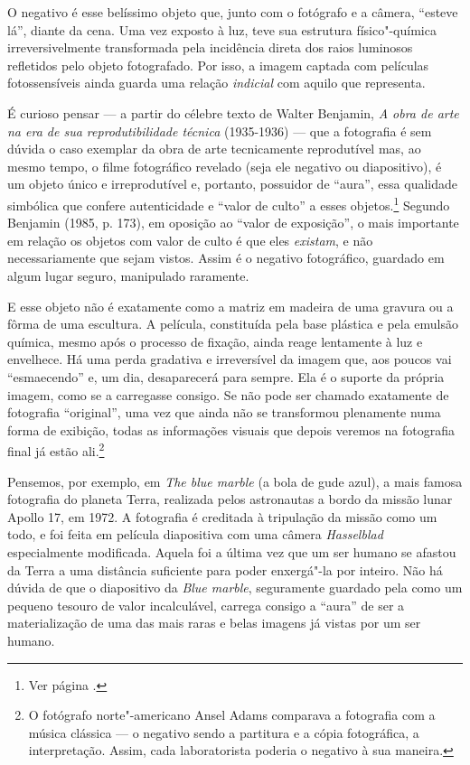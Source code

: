 O negativo é esse belíssimo objeto que, junto com o fotógrafo e a
câmera, ``esteve lá'', diante da cena. Uma vez exposto à luz, teve sua
estrutura físico"-química irreversivelmente transformada pela incidência
direta dos raios luminosos refletidos pelo objeto fotografado. Por isso,
a imagem captada com películas fotossensíveis ainda guarda uma relação
\emph{indicial} com aquilo que representa.

É curioso pensar --- a partir do célebre texto de Walter Benjamin,
\emph{A obra de arte na era de sua reprodutibilidade técnica} (1935-1936)
--- que a fotografia é sem dúvida o caso exemplar da obra de arte
tecnicamente reprodutível mas, ao mesmo tempo, o filme fotográfico
revelado (seja ele negativo ou diapositivo), é um objeto único e
irreprodutível e, portanto, possuidor de ``aura'', essa qualidade
simbólica que confere autenticidade e ``valor de culto'' a esses
objetos.\footnote{Ver página \pageref{benjamin}.} Segundo Benjamin
(1985, p. 173), em oposição ao ``valor de exposição'', o mais importante
em relação os objetos com valor de culto é que eles \emph{existam}, e
não necessariamente que sejam vistos. Assim é o negativo fotográfico,
guardado em algum lugar seguro, manipulado raramente.

E esse objeto não é exatamente como a matriz em madeira de uma gravura
ou a fôrma de uma escultura. A película, constituída pela base plástica
e pela emulsão química, mesmo após o processo de fixação, ainda reage
lentamente à luz e envelhece. Há uma perda gradativa e irreversível da
imagem que, aos poucos vai ``esmaecendo'' e, um dia, desaparecerá para
sempre. Ela é o suporte da própria imagem, como se a carregasse consigo.
Se não pode ser chamado exatamente de fotografia ``original'', uma vez
que ainda não se transformou plenamente numa forma de exibição, todas as
informações visuais que depois veremos na fotografia final já estão
ali.\footnote{O fotógrafo norte"-americano Ansel Adams comparava a
  fotografia com a música clássica --- o negativo sendo a partitura e a
  cópia fotográfica, a interpretação. Assim, cada laboratorista poderia
  {} o negativo à sua maneira.}

Pensemos, por exemplo, em \emph{The blue marble} (a bola de gude azul), \label{marble}
a mais famosa fotografia do planeta Terra, realizada pelos astronautas a
bordo da missão lunar Apollo 17, em 1972. A fotografia é creditada à
tripulação da missão como um todo, e foi feita em película diapositiva
com uma câmera \emph{Hasselblad} especialmente modificada. Aquela foi a
última vez que um ser humano se afastou da Terra a uma distância
suficiente para poder enxergá"-la por inteiro. Não há dúvida de que o
diapositivo da \emph{Blue marble}, seguramente guardado pela  como
um pequeno tesouro de valor incalculável, carrega consigo a ``aura'' de
ser a materialização de uma das mais raras e belas imagens já vistas por
um ser humano.

